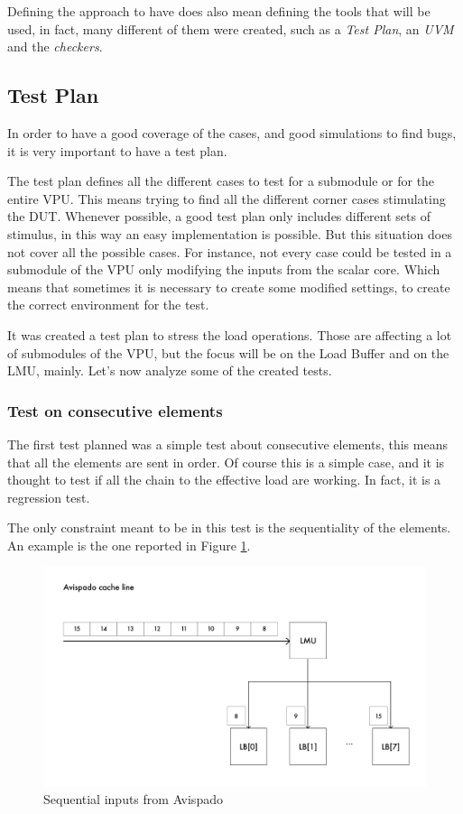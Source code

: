 Defining the approach to have does also mean defining the tools that will be used, in fact, many different of them were created, such as a \textit{Test Plan}, an \textit{UVM} and the \textit{checkers}.


\subsection{Test Plan}
In order to have a good coverage of the cases, and good simulations to find bugs, it is very important to have a test plan.

The test plan defines all the different cases to test for a submodule or for the entire VPU. This means trying to find all the different corner cases stimulating the DUT.
Whenever possible, a good test plan only includes different sets of stimulus, in this way an easy implementation is possible. But this situation does not cover all the possible cases. For instance, not every case could be tested in a submodule of the VPU only modifying the inputs from the scalar core.
Which means that sometimes it is necessary to create some modified settings, to create the correct environment for the test.

It was created a test plan to stress the load operations. Those are affecting a lot of submodules of the VPU, but the focus will be on the Load Buffer and on the LMU, mainly.
Let's now analyze some of the created tests.

\subsubsection{Test on consecutive elements}
The first test planned was a simple test about consecutive elements, this means that all the elements are sent in order. Of course this is a simple case, and it is thought to test if all the chain to the effective load are working. In fact, it is a regression test.

The only constraint meant to be in this test is the sequentiality of the elements.
An example is the one reported in Figure \ref{cache-to-lb-seq-ex}.


\begin{figure}[H]
    \centering
    \includegraphics[scale = 0.6]{Chapter_2/img/cache-to-lb-seq-ex.png}
    \caption{Sequential inputs from Avispado}
    \label{cache-to-lb-seq-ex}
\end{figure}

